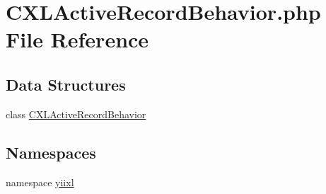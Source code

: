 \hypertarget{CXLActiveRecordBehavior_8php}{
\section{CXLActiveRecordBehavior.php File Reference}
\label{CXLActiveRecordBehavior_8php}
}
\subsection*{Data Structures}
\begin{DoxyCompactItemize}
\item 
class \hyperlink{classCXLActiveRecordBehavior}{CXLActiveRecordBehavior}
\end{DoxyCompactItemize}
\subsection*{Namespaces}
\begin{DoxyCompactItemize}
\item 
namespace \hyperlink{namespaceyiixl}{yiixl}
\end{DoxyCompactItemize}
